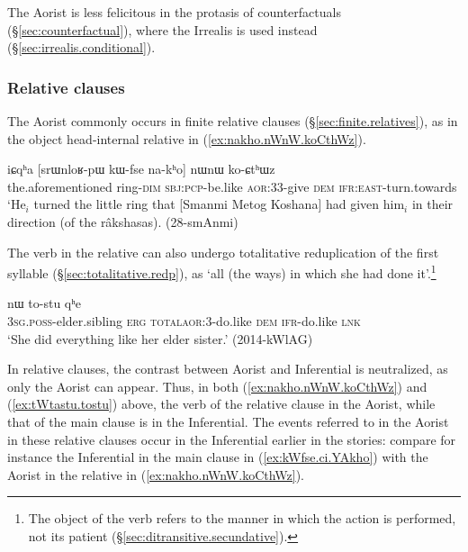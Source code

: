 The Aorist is less felicitous in the protasis of counterfactuals (§\ref{sec:counterfactual}), where the Irrealis is used instead (§\ref{sec:irrealis.conditional}).

\subsubsection{Relative clauses }   \label{sec:aor.relative}
 
The Aorist commonly occurs in finite relative clauses (§\ref{sec:finite.relatives}), as in the object head-internal relative in (\ref{ex:nakho.nWnW.koCthWz}).


\begin{exe}
\ex \label{ex:nakho.nWnW.koCthWz}
\gll iɕqʰa [srɯnloʁ-pɯ kɯ-fse na-kʰo] nɯnɯ ko-ɕtʰɯz \\
the.aforementioned ring-\textsc{dim} \textsc{sbj}:\textsc{pcp}-be.like \textsc{aor}:3\fl{}3-give \textsc{dem} \textsc{ifr}:\textsc{east}-turn.towards \\
\glt `He$_i$ turned the little ring that [Smanmi Metog Koshana] had given him$_i$ in their direction (of the râkshasas). (28-smAnmi) 
\end{exe}
 
The verb in the relative can also undergo totalitative reduplication of the first syllable (§\ref{sec:totalitative.redp}), as  `all (the ways) in which she had done it'.\footnote{The object of the verb  refers to the manner in which the action is performed, not its patient (§\ref{sec:ditransitive.secundative}). }

\begin{exe}
\ex \label{ex:tWtastu.tostu}
 nɯ to-stu qʰe \\
\textsc{3sg}.\textsc{poss}-elder.sibling \textsc{erg} \textsc{total}\redp{}\textsc{aor}:3\flobv{}-do.like \textsc{dem} \textsc{ifr}-do.like \textsc{lnk} \\
\glt `She did everything like her elder sister.' (2014-kWlAG)
\end{exe}

In relative clauses, the contrast between Aorist and Inferential is neutralized, as only the Aorist can appear. Thus, in both (\ref{ex:nakho.nWnW.koCthWz}) and (\ref{ex:tWtastu.tostu}) above, the verb of the relative clause in the Aorist, while that of the main clause is in the Inferential. The events referred to in the Aorist in these relative clauses occur in the Inferential earlier in the stories: compare for instance the Inferential  in the main clause in (\ref{ex:kWfse.ci.YAkho}) with the Aorist  in the relative in (\ref{ex:nakho.nWnW.koCthWz}).

